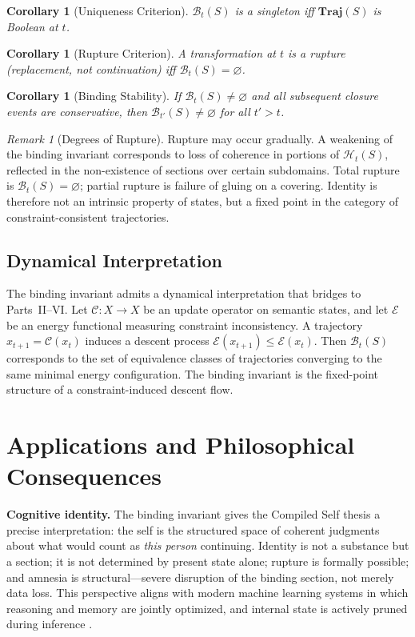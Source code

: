 \documentclass[11pt, letterpaper]{article}
\theoremstyle{plain}
\newtheorem{corollary}[theorem]{Corollary}
\theoremstyle{definition}
\theoremstyle{remark}
\newtheorem{remark}[theorem]{Remark}
\newcommand{\BI}{\mathcal{B}}
\newcommand{\CC}{\mathcal{C}}
\newcommand{\HH}{\mathcal{H}}
\newcommand{\EE}{\mathcal{E}}
\begin{document}
\begin{corollary}[Uniqueness Criterion]
$\BI_t(S)$ is a singleton iff $\mathbf{Traj}(S)$ is Boolean at $t$.
\end{corollary}

\begin{corollary}[Rupture Criterion]
\label{cor:rupture}
A transformation at $t$ is a \emph{rupture} (replacement, not continuation) iff
$\BI_t(S) = \varnothing$.
\end{corollary}

\begin{corollary}[Binding Stability]
\label{cor:stability}
If $\BI_t(S) \neq \varnothing$ and all subsequent closure events are conservative,
then $\BI_{t'}(S) \neq \varnothing$ for all $t' > t$.
\end{corollary}

\begin{remark}[Degrees of Rupture]
Rupture may occur gradually. A weakening of the binding invariant corresponds to loss
of coherence in portions of $\HH_t(S)$, reflected in the non-existence of sections
over certain subdomains. Total rupture is $\BI_t(S) = \varnothing$; partial rupture is
failure of gluing on a covering. Identity is therefore not an intrinsic property of
states, but a fixed point in the category of constraint-consistent trajectories.
\end{remark}

\subsection{Dynamical Interpretation}

The binding invariant admits a dynamical interpretation that bridges to Parts~II--VI.
Let $\CC : X \to X$ be an update operator on semantic states, and let $\EE$ be an
energy functional measuring constraint inconsistency. A trajectory $x_{t+1} = \CC(x_t)$
induces a descent process $\EE(x_{t+1}) \leq \EE(x_t)$. Then $\BI_t(S)$ corresponds
to the set of equivalence classes of trajectories converging to the same minimal energy
configuration. The binding invariant is the fixed-point structure of a
constraint-induced descent flow.

\section{Applications and Philosophical Consequences}

\textbf{Cognitive identity.} The binding invariant gives the Compiled Self thesis a
precise interpretation: the self is the structured space of coherent judgments about
what would count as \emph{this person} continuing. Identity is not a substance but a
section; it is not determined by present state alone; rupture is formally possible; and
amnesia is structural---severe disruption of the binding section, not merely data loss.
This perspective aligns with modern machine learning systems in which reasoning and
memory are jointly optimized, and internal state is actively pruned during inference
\cite{ngc2026}.
\end{document}
